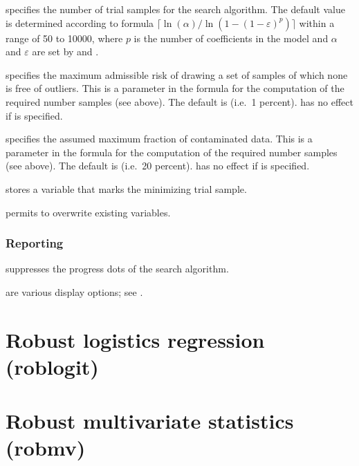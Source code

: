 \hangpara
     specifies the number of trial samples for the search
    algorithm. The default value is determined according to formula
    $
    \lceil \ln(\alpha) / \ln(1 - (1 - \varepsilon)^p) \rceil
    $
    within a range of 50 to 10000, where $p$ is the number of coefficients in
    the model and $\alpha$ and $\varepsilon$ are set by  and
    .

\hangpara
     specifies the maximum admissible risk of drawing a set
    of samples of which none is free of outliers. This is a parameter in the
    formula for the computation of the required number samples (see above). The
    default is  (i.e.\ 1 percent).  has no
    effect if  is specified.

\hangpara
     specifies the assumed maximum fraction of
    contaminated data. This is a parameter in the formula for the computation
    of the required number samples (see above). The default is
     (i.e.\ 20 percent).  has no effect if
     is specified.

\hangpara
     stores a variable  that marks the
    minimizing trial sample.

\hangpara
     permits  to overwrite existing variables.

\subsubsection{Reporting}

\hangpara
     suppresses the progress dots of the search algorithm.

\hangpara
     are various display options; see .

\section{Robust logistics regression (roblogit)}
\label{sec:syntax:roblogit}

\section{Robust multivariate statistics (robmv)}
\label{sec:syntax:robmv}